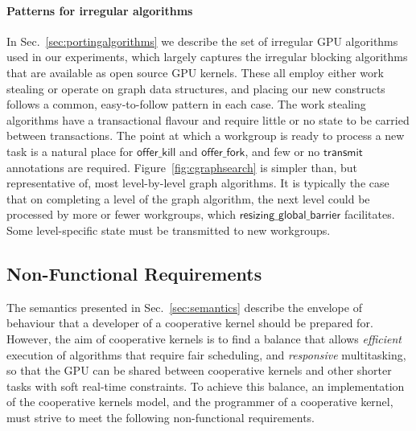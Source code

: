 \documentclass[numbers,nocopyrightspace,10pt]{sigplanconf}
\newcommand{\myfiglong}{Figure~}
\newcommand{\mysec}{Sec.~}
\newcommand{\transmit}{\mathsf{transmit}}
\newcommand{\offerfork}{\mathsf{offer\_fork}}
\newcommand{\offerkill}{\mathsf{offer\_kill}}
\newcommand{\resizingglobalbarrier}{\mathsf{resizing\_global\_barrier}}
\begin{document}
\paragraph{Patterns for irregular algorithms}
In \mysec\ref{sec:portingalgorithms} we describe the set of irregular GPU algorithms used
in our experiments, which largely captures the irregular blocking
algorithms that are available as open source GPU kernels.  These all
employ either work stealing or operate on graph data structures, and placing our new constructs follows a common, easy-to-follow pattern in each case.
%
The work stealing algorithms have a transactional flavour
and require little or no state to be carried between transactions.  The point at which a workgroup is ready to process a new task is a natural place for $\offerkill$ and $\offerfork$, and few or no $\transmit$ annotations are required.
%
\myfiglong\ref{fig:cgraphsearch} is simpler than, but representative of,
most level-by-level graph algorithms.
It is typically the case that on completing a level of
the graph algorithm, the next level could be processed by more or
fewer workgroups, which $\resizingglobalbarrier$
facilitates.  Some level-specific state must be transmitted to new workgroups.



\subsection{Non-Functional Requirements}\label{sec:nonfunctional}

The semantics presented in \mysec\ref{sec:semantics} describe the envelope of
behaviour that a developer of a cooperative kernel should be prepared
for.
%
However, the aim of cooperative kernels is to find a balance that
allows \emph{efficient} execution of algorithms that require fair scheduling, and
\emph{responsive} multitasking, so that the GPU can be shared between
cooperative kernels and other shorter tasks with soft real-time constraints.
%
To achieve this balance, an implementation of the cooperative
kernels model, and the programmer of a cooperative kernel, must strive
to meet the following non-functional requirements.

\end{document}
